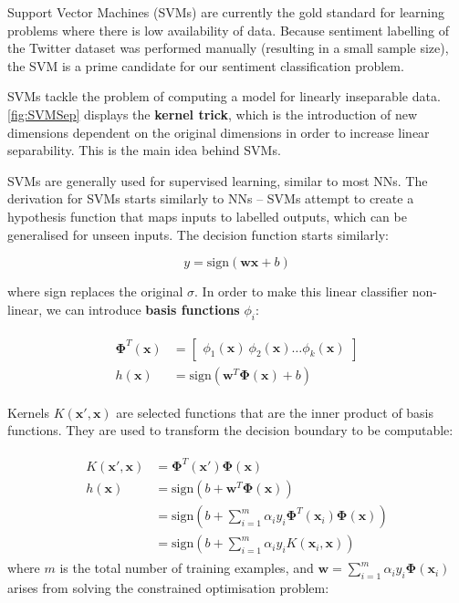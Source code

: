 \documentclass[12pt,a4paper,twoside,openright]{report}
\renewcommand{\vec}[1]{\mathbf{#1}}
\begin{document}

Support Vector Machines (SVMs) are currently the gold standard for learning problems where
there is low availability of data. Because sentiment
labelling of the Twitter dataset was performed manually (resulting in a small sample size), the SVM is a prime candidate
for our sentiment classification problem.

SVMs tackle the problem of computing a model
for linearly inseparable data. \cref{fig:SVMSep} displays the \textbf{kernel trick}, which is the
introduction of new dimensions dependent on the original dimensions in order to increase linear separability.
This is the main idea behind SVMs.

SVMs are generally used for supervised learning, similar to most NNs. The derivation
for SVMs starts similarly to NNs -- SVMs attempt to create a hypothesis function
that maps inputs to labelled outputs, which can be generalised for unseen inputs.
The decision function starts similarly:

\begin{equation}
y = \text{sign}(\vec{wx} + b)
\end{equation}

where sign replaces the original $\sigma$.
In order to make this linear classifier non-linear, we can introduce \textbf{basis functions} $\phi_i$\cite{Holden18}:

\begin{align}
\begin{split}
	\vec{\Phi}^T(\vec{x}) &= 
	\begin{bmatrix}
	\phi_1(\vec{x})\ \phi_2(\vec{x}) \dots \phi_k(\vec{x})
	\end{bmatrix}\\
	h(\vec{x}) &= \text{sign}(\vec{w}^T\vec{\Phi}(\vec{x}) + b)
\end{split}
\end{align}

Kernels $K(\vec{x}',\vec{x})$ are selected functions that are the inner product of basis functions.
They are used to transform the decision boundary to be computable:

\begin{align}
\begin{split}
	K(\vec{x}',\vec{x}) &= \vec{\Phi}^T(\vec{x}')\vec{\Phi}(\vec{x})\\
	h(\vec{x}) &= \text{sign}(b + \vec{w}^T\vec{\Phi}(\vec{x}))\\
	&=\text{sign}(b + \sum_{i=1}^m \alpha_iy_i\vec{\Phi}^T(\vec{x}_i)\vec{\Phi}(\vec{x}))\\
	&=\text{sign}(b + \sum_{i=1}^m \alpha_iy_i K(\vec{x}_i,\vec{x}))
\end{split}
\end{align}
where $m$ is the total number of training examples, and $\vec{w} = \sum_{i=1}^m \alpha_iy_i\vec{\Phi}(\vec{x}_i)$
arises from solving
the constrained optimisation problem:\\
\end{document}
